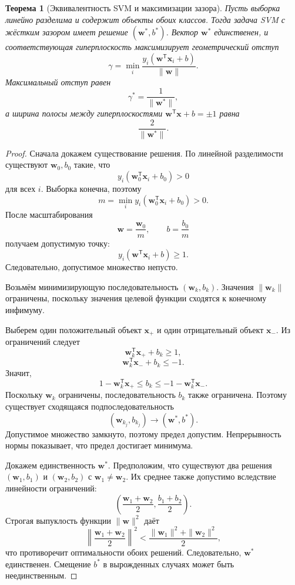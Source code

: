 \documentclass[12pt,a4paper]{article}
\newtheorem{theorem}{Теорема}[section]
\theoremstyle{definition}
\newcommand{\T}{\mathsf{T}}
\newcommand{\1}{\mathbf{1}}
\begin{document}
\begin{theorem}[Эквивалентность SVM и максимизации зазора]
Пусть выборка линейно разделима и содержит объекты обоих классов.
Тогда задача SVM с жёстким зазором имеет решение
$(\bm{w}^{*},b^{*})$. Вектор $\bm{w}^{*}$ единственен, и соответствующая
гиперплоскость максимизирует геометрический отступ
\[
    \gamma
    =
    \min_i
    \frac{y_i(\bm{w}^{\T}\bm{x}_i+b)}
         {\|\bm{w}\|}.
\]
Максимальный отступ равен
\[
    \gamma^{*}=\frac{1}{\|\bm{w}^{*}\|},
\]
а ширина полосы между гиперплоскостями
$\bm{w}^{\T}\bm{x}+b=\pm1$ равна
\[
    \frac{2}{\|\bm{w}^{*}\|}.
\]
\end{theorem}

\begin{proof}
Сначала докажем существование решения. По линейной разделимости
существуют $\bm{w}_0,b_0$ такие, что
\[
    y_i(\bm{w}_0^{\T}\bm{x}_i+b_0)>0
\]
для всех $i$. Выборка конечна, поэтому
\[
    m
    =
    \min_i
    y_i(\bm{w}_0^{\T}\bm{x}_i+b_0)>0.
\]
После масштабирования
\[
    \bm{w}=\frac{\bm{w}_0}{m},
    \qquad
    b=\frac{b_0}{m}
\]
получаем допустимую точку:
\[
    y_i(\bm{w}^{\T}\bm{x}_i+b)\geq1.
\]
Следовательно, допустимое множество непусто.

Возьмём минимизирующую последовательность
$(\bm{w}_k,b_k)$. Значения $\|\bm{w}_k\|$ ограничены, поскольку
значения целевой функции сходятся к конечному инфимуму.

Выберем один положительный объект $\bm{x}_+$ и один отрицательный
объект $\bm{x}_-$. Из ограничений следует
\[
    \bm{w}_k^{\T}\bm{x}_+ + b_k\geq1,
\]
\[
    \bm{w}_k^{\T}\bm{x}_- + b_k\leq-1.
\]
Значит,
\[
    1-\bm{w}_k^{\T}\bm{x}_+
    \leq
    b_k
    \leq
    -1-\bm{w}_k^{\T}\bm{x}_-.
\]
Поскольку $\bm{w}_k$ ограничены, последовательность $b_k$ также
ограничена. Поэтому существует сходящаяся подпоследовательность
\[
    (\bm{w}_{k_j},b_{k_j})
    \to
    (\bm{w}^{*},b^{*}).
\]
Допустимое множество замкнуто, поэтому предел допустим.
Непрерывность нормы показывает, что предел достигает минимума.

Докажем единственность $\bm{w}^{*}$. Предположим, что существуют два
решения $(\bm{w}_1,b_1)$ и $(\bm{w}_2,b_2)$ с
$\bm{w}_1\neq\bm{w}_2$. Их среднее также допустимо вследствие
линейности ограничений:
\[
    \left(
        \frac{\bm{w}_1+\bm{w}_2}{2},
        \frac{b_1+b_2}{2}
    \right).
\]
Строгая выпуклость функции $\|\bm{w}\|^2$ даёт
\[
    \left\|
        \frac{\bm{w}_1+\bm{w}_2}{2}
    \right\|^2
    <
    \frac{\|\bm{w}_1\|^2+\|\bm{w}_2\|^2}{2},
\]
что противоречит оптимальности обоих решений. Следовательно,
$\bm{w}^{*}$ единственен. Смещение $b^{*}$ в вырожденных случаях
может быть неединственным.


\end{proof}
\end{document}
